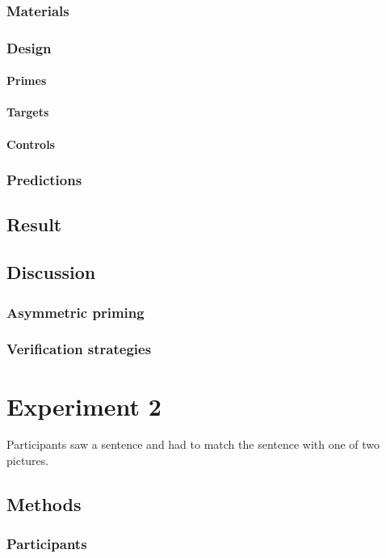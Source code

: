 \documentclass[a4paper]{article}
\begin{document}
\subsubsection{Materials}
\subsubsection{Design}
\paragraph{Primes}
\paragraph{Targets}
\paragraph{Controls}

\subsubsection{Predictions}


\subsection{Result}
\subsection{Discussion}
\subsubsection{Asymmetric priming}
\subsubsection{Verification strategies}

\section{Experiment 2}

Participants saw a sentence and had to match the sentence with one of two pictures. 

\subsection{Methods}

\subsubsection{Participants}
\end{document}
